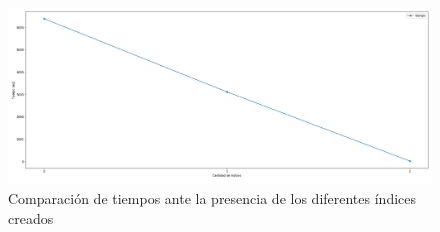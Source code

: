 \documentclass[12pt]{report}
\begin{document}
\begin{figure}[!ht]
    \centering
    \includegraphics[width=1\textwidth]{images/tiempo.png}
    \caption{Comparación de tiempos ante la presencia de los diferentes índices creados}
    \centering
    \label{label:file_name}
\end{figure}
\end{document}
